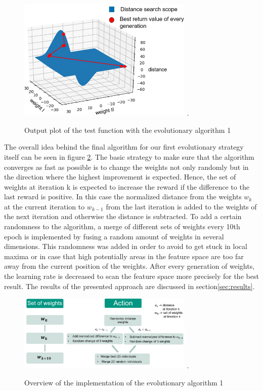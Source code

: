 \begin{figure}[H]
	\centering
	\includegraphics[width=3.3in]{img/test_function.png}
	\DeclareGraphicsExtensions.
	\caption{Output plot of the test function with the evolutionary algorithm 1}
	\label{fig:test_function}
\end{figure}

The overall idea behind the final algorithm for our first evolutionary strategy itself can be seen in figure \ref{fig:evo_strat_1}. The basic strategy to make sure that the algorithm converges as fast as possible is to change the weights not only randomly but in the direction where the highest improvement is expected. Hence, the set of weights at iteration k is expected to increase the reward if the difference to the last reward is positive. In this case the normalized distance from the weights $w_k$  at the current iteration to $w_{k-1}$ from the last iteration is added to the weights of the next iteration and otherwise the distance is subtracted. To add a certain randomness to the algorithm, a merge of different sets of weights every 10th epoch is implemented by fusing a random amount of weights in several dimensions. This randomness was added in order to avoid to get stuck in local maxima or in case that high potentially areas in the feature space are too far away from the current position of the weights. After every generation of weights, the learning rate is decreased to scan the feature space more precisely for the best result. 
The results of the presented approach are discussed in section\ref{sec:results}.

\begin{figure}[H]
	\centering
	\includegraphics[width=3.3in]{img/evo_strat_1.png}
	\DeclareGraphicsExtensions.
	\caption{Overview of the implementation of the evolutionary algorithm 1}
	\label{fig:evo_strat_1}
\end{figure}

